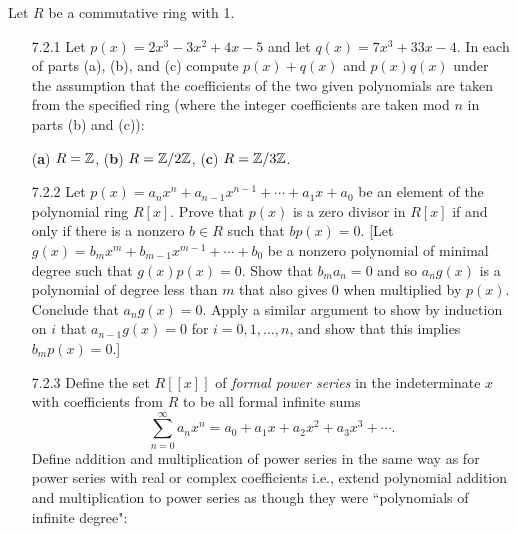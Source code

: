 Let $R$ be a commutative ring with 1.
\begin{enumerate}
   \item[7.2.1]   Let $p(x) = 2x^3 - 3x^2 + 4x - 5$ and let
                  $q(x) = 7x^3 + 33x - 4$. In each of parts (a), (b), and (c)
                  compute $p(x) + q(x)$ and $p(x)q(x)$ under the assumption that
                  the coefficients of the two given polynomials are taken from
                  the specified ring (where the integer coefficients are taken
                  mod $n$ in parts (b) and (c)):
                  
                  (\textbf{a}) $R = \mathbb{Z}$, \quad (\textbf{b}) $R = \mathbb{Z}/2\mathbb{Z}$, \quad
                  (\textbf{c}) $R = \mathbb{Z}/3\mathbb{Z}$.
   \item[7.2.2]   Let $p(x) = a_nx^n + a_{n-1}x^{n-1}+\cdots+a_1x+a_0$ be an
                  element of the polynomial ring $R[x]$. Prove that $p(x)$ is a
                  zero divisor in $R[x]$ if and only if there is a nonzero 
                  $b \in R$ such that $bp(x) = 0$. [Let $g(x) = b_mx^m +
                  b_{m-1}x^{m-1} + \cdots + b_0$ be a nonzero polynomial of
                  minimal degree such that $g(x)p(x) = 0$. Show that
                  $b_ma_n = 0$ and so $a_ng(x)$ is a polynomial of degree less
                  than $m$ that also gives 0 when multiplied by $p(x)$. Conclude
                  that $a_ng(x) = 0$. Apply a similar argument to show by
                  induction on $i$ that $a_{n-1}g(x) = 0$ for
                  $i = 0, 1, \ldots, n$, and show that this implies
                  $b_mp(x) = 0$.]
   \item[7.2.3]   Define the set $R[[x]]$ of \textit{formal power series} in the
                  indeterminate $x$ with coefficients from $R$ to be all formal
                  infinite sums
                  $$\sum_{n=0}^\infty a_nx^n = a_0 + a_1x +
                       a_2x^2 + a_3x^3 + \cdots.$$
                  Define addition and multiplication of power series in the same
                  way as for power series with real or complex coefficients
                  i.e., extend polynomial addition and multiplication to power
                  series as though they were ``polynomials of infinite degree":
                  \begin{align*}

\end{align*}
\end{enumerate}
